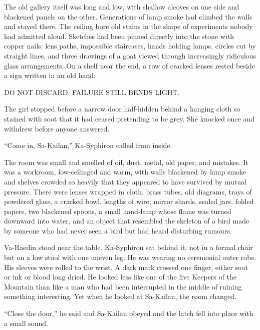 The old gallery itself was long and low, with shallow alcoves on one side and blackened panels on the other. 
Generations of lamp smoke had climbed the walls and stayed there. 
The ceiling bore old stains in the shape of experiments nobody had admitted aloud. 
Sketches had been pinned directly into the stone with copper nails: lens paths, impossible staircases, hands holding lamps, circles cut by straight lines, and three drawings of a goat viewed through increasingly ridiculous glass arrangements. 
On a shelf near the end, a row of cracked lenses rested beside a sign written in an old hand:\par

\begin{scripture}
DO NOT DISCARD. FAILURE STILL BENDS LIGHT.
\end{scripture}

The girl stopped before a narrow door half-hidden behind a hanging cloth so stained with soot that it had ceased pretending to be grey. 
She knocked once and withdrew before anyone answered.\par

“Come in, Sa-Kailan,” Ka-Syphiron called from inside.\par

The room was small and smelled of oil, dust, metal, old paper, and mistakes.
It was a workroom, low-ceilinged and warm, with walls blackened by lamp smoke and shelves crowded so heavily that they appeared to have survived by mutual pressure. 
There were lenses wrapped in cloth, brass tubes, old diagrams, trays of powdered glass, a cracked bowl, lengths of wire, mirror shards, sealed jars, folded papers, two blackened spoons, 
a small hand-lamp whose flame was turned downward into water, and an object that resembled the skeleton of a bird made by someone who had never seen a bird but had heard disturbing rumours.\par

Va-Raedin stood near the table. 
Ka-Syphiron sat behind it, not in a formal chair but on a low stool with one uneven leg. 
He was wearing no ceremonial outer robe. 
His sleeves were rolled to the wrist. 
A dark mark crossed one finger, either soot or ink or blood long dried. He looked less like one of the five Keepers of the Mountain than like a man who had been interrupted in the middle of ruining something interesting.
Yet when he looked at Sa-Kailan, the room changed.\par

“Close the door,” he said and Sa-Kailan obeyed and the latch fell into place with a small sound.\par

